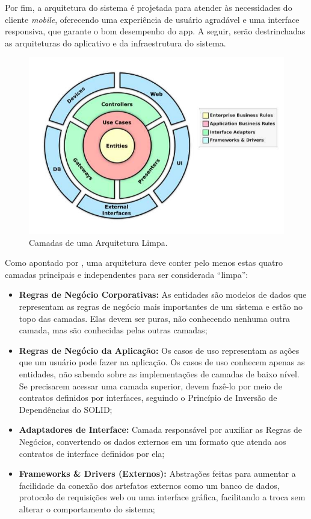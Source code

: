 Por fim, a arquitetura do sistema é projetada para atender às necessidades do cliente \textit{mobile}, oferecendo uma experiência de usuário agradável e uma interface responsiva, que garante o bom desempenho do \ac{app}. A seguir, serão destrinchadas as arquiteturas do aplicativo e da infraestrutura do sistema.

\begin{figure}[H]
\centering
  \includegraphics[width=0.9\columnwidth]{images/clean_dart.pdf}
  \caption{Camadas de uma Arquitetura Limpa.}
  \label{fig:clean_dart}
\end{figure}

Como apontado por \cite{martin2018arquitetura}, uma arquitetura deve conter pelo menos estas quatro camadas principais e independentes para ser considerada “limpa”:
\begin{itemize}
   \item \textbf{Regras de Negócio Corporativas:} As entidades são modelos de dados que representam as regras de negócio mais importantes de um sistema e estão no topo das camadas. Elas devem ser puras, não conhecendo nenhuma outra camada, mas são conhecidas pelas outras camadas;
   \item \textbf{Regras de Negócio da Aplicação:} Os casos de uso representam as ações que um usuário pode fazer na aplicação. Os casos de uso conhecem apenas as entidades, não sabendo sobre as implementações de camadas de baixo nível. Se precisarem acessar uma camada superior, devem fazê-lo por meio de contratos definidos por interfaces, seguindo o Princípio de Inversão de Dependências do SOLID;
   \item \textbf{Adaptadores de Interface:} Camada responsável por auxiliar as Regras de Negócios, convertendo os dados externos em um formato que atenda aos contratos de interface definidos por ela;
   \item \textbf{Frameworks \& Drivers (Externos):} Abstrações feitas para aumentar a facilidade da conexão dos artefatos externos como um banco de dados, protocolo de requisições web ou uma interface gráfica, facilitando a troca sem alterar o comportamento do sistema;
 \end{itemize}

